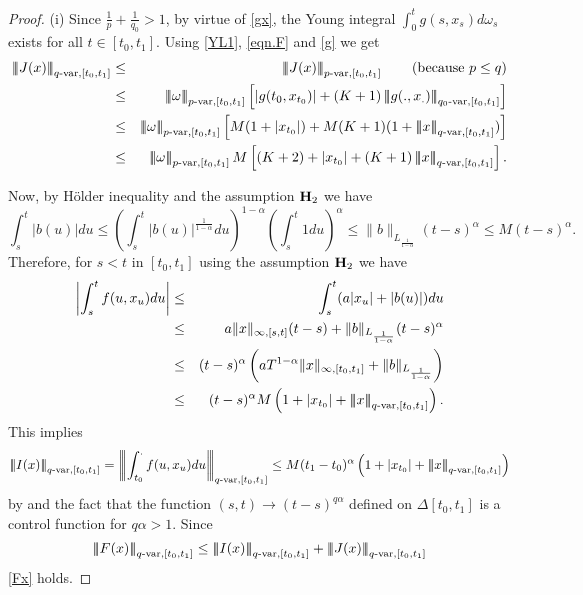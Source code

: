 \documentclass[10pt]{article}
\numberwithin{equation}{section} %
\newcommand{\ltn}{\ensuremath{\left| \! \left| \! \left|}}
\newcommand{\rtn}{\ensuremath{\right| \! \right| \! \right|}}
\begin{document}
\begin{proof}%
(i)	Since $\frac{1}{p}+\frac{1}{q_0} > 1$, by virtue of \eqref{gx}, the Young integral $\int_0^tg(s,x_s)d\omega_s$ exists for all $t\in [t_0,t_1]$. Using \eqref{YL1}, \eqref{eqn.F} and \eqref{g} we get 
	\begin{eqnarray*}
		\ltn J(x)\rtn_{q\text{-var},[t_0,t_1]}&\leq&\ltn J(x)\rtn_{p\text{-var},[t_0,t_1]}\qquad \text {(because $p \leq q$)} \notag\\
		&\leq& \ltn\omega\rtn_{p\text{-var},[t_0,t_1]}\left[|g(t_0,x_{t_0})|+ (K+1) \ltn g(.,x_.)\rtn_{q_0\text{-var},[t_0,t_1]}\right]\notag\\
		&\leq & \ltn\omega\rtn_{p\text{-var},[t_0,t_1]}\left[M(1+|x_{t_0}|)+M(K+1)(1+\ltn x\rtn_{q\text{-var},[t_0,t_1]})\right]\\
		&\leq &\ltn\omega\rtn_{p\text{-var},[t_0,t_1]}M\left[ (K+2) + |x_{t_0}| +(K+1)\ltn x\rtn_{q\text{-var},[t_0,t_1]}  \right].
	\end{eqnarray*}

Now, by H\"older inequality and the assumption ${\textbf H}_2$ we have 
	$$
	\int_s^t |b(u)|du\leq \left (\int_s^t|b(u)|^\frac{1}{1-\alpha} du \right)^{1-\alpha}  \left (\int_s^t 1 du \right)^\alpha\leq \|b\|_{L_{\frac{1}{1-\alpha}}} (t-s)^{\alpha}\leq M(t-s)^{\alpha}.
	$$ 
	Therefore, for $s<t$ in $[t_0,t_1]$ using the assumption ${\textbf H}_2$ we have %
	\begin{eqnarray*}
	\left|\int_s^tf(u,x_u)du\right| &\leq & \int_s^t( a|x_u|+|b(u)|)du\\
	&\leq &  a\|x\|_{\infty,[s,t]}(t-s) + \|b\|_{L_{\frac{1}{1-\alpha}}} (t-s)^{\alpha}\\
	&\leq & (t-s)^{\alpha} \left(aT^{1-\alpha}\|x\|_{\infty,[t_0,t_1]} + \|b\|_{L_{\frac{1}{1-\alpha}}}\right)\\
	&\leq & (t-s)^{\alpha}M \left(1+|x_{t_0}|+\ltn x\rtn_{q\text{-var},[t_0,t_1]}\right).
	\end{eqnarray*}
This implies 
	\begin{eqnarray*}
	\ltn I(x)\rtn_{q\text{-var},[t_0,t_1]}=\ltn\int_{t_0}^.f(u,x_u)du\rtn_{q\text{-var},[t_0,t_1]}\leq M(t_1-t_0)^{\alpha} \left(1+|x_{t_0}|+\ltn x\rtn_{q\text{-var},[t_0,t_1]}\right)
	\end{eqnarray*}
by \cite[Proposition 5.10(i), p. 83] {friz} and the fact that the function $(s,t)\to (t-s)^{q\alpha}$ defined on $\Delta[t_0,t_1]$ is a control function for $q\alpha > 1$.
Since 
$$
\ltn F(x)\rtn_{q\text{-var},[t_0,t_1]}\leq \ltn I(x)\rtn_{q\text{-var},[t_0,t_1]}+\ltn J(x)\rtn_{q\text{-var},[t_0,t_1]}
$$	
\eqref{Fx} holds.


\end{proof}
\end{document}

